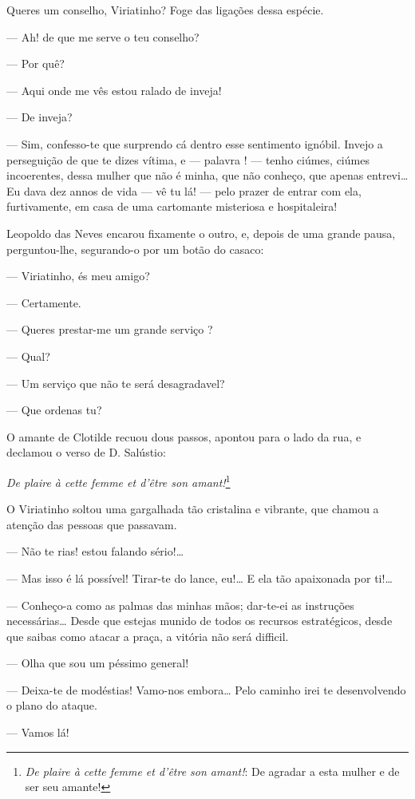 Queres um conselho, Viriatinho? Foge das ligações dessa espécie.

--- Ah! de que me serve o teu conselho?

--- Por quê?

--- Aqui onde me vês estou ralado de inveja!

--- De inveja?

--- Sim, confesso-te que surprendo cá dentro esse sentimento ignóbil.
Invejo a perseguição de que te dizes vítima, e --- palavra ! --- tenho
ciúmes, ciúmes incoerentes, dessa mulher que não é minha, que não
conheço, que apenas entrevi\ldots{} Eu dava dez annos de vida --- vê tu lá!
--- pelo prazer de entrar com ela, furtivamente, em casa de uma
cartomante misteriosa e hospitaleira!

Leopoldo das Neves encarou fixamente o outro, e, depois de uma grande
pausa, perguntou-lhe, segurando-o por um botão do casaco:

--- Viriatinho, és meu amigo?

--- Certamente.

--- Queres prestar-me um grande serviço ?

--- Qual?

--- Um serviço que não te será desagradavel?

--- Que ordenas tu?

O amante de Clotilde recuou dous passos, apontou para o lado da rua, e
declamou o verso de D. Salústio:

\emph{De plaire à cette femme et d'être son amant!}\footnote{\emph{De
  plaire à cette femme et d'être son amant!}: De agradar a esta mulher e
  de ser seu amante!}

O Viriatinho soltou uma gargalhada tão cristalina e vibrante, que chamou
a atenção das pessoas que passavam.

--- Não te rias! estou falando sério!\ldots{}

--- Mas isso é lá possível! Tirar-te do lance, eu!\ldots{} E ela tão
apaixonada por ti!\ldots{}

--- Conheço-a como as palmas das minhas mãos; dar-te-ei as instruções
necessárias\ldots{} Desde que estejas munido de todos os recursos
estratégicos, desde que saibas como atacar a praça, a vitória não será
difficil.

--- Olha que sou um péssimo general!

--- Deixa-te de modéstias! Vamo-nos embora\ldots{} Pelo caminho irei te
desenvolvendo o plano do ataque.

--- Vamos lá!

